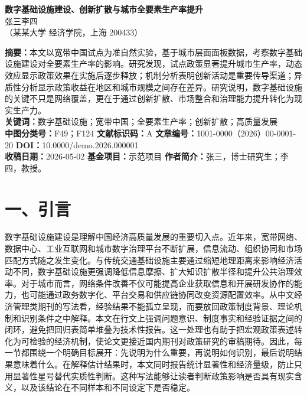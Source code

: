 \documentclass[12pt,a4paper]{article}
\begin{document}
\begin{center}
{\bfseries 数字基础设施建设、创新扩散与城市全要素生产率提升}\\[0.8em]
{ 张三\quad 李四}\\[0.4em]
{\small （某某大学 经济学院，上海 200433）}
\end{center}
\noindent\textbf{摘\quad 要：}本文以宽带中国试点为准自然实验，基于城市层面面板数据，考察数字基础设施建设对全要素生产率的影响。研究发现，试点政策显著提升城市生产率，动态效应显示政策效果在实施后逐步释放；机制分析表明创新活动是重要传导渠道；异质性分析显示政策收益在地区和城市规模之间存在差异。研究说明，数字基础设施的关键不只是网络覆盖，更在于通过创新扩散、市场整合和治理能力提升转化为现实生产力。\\
\textbf{关键词：}数字基础设施；宽带中国；全要素生产率；创新扩散；高质量发展\\
\textbf{中图分类号：}F49；F124\quad
\textbf{文献标识码：}A\quad
\textbf{文章编号：}1001-0000（2026）00-0001-20\quad
\textbf{DOI：}10.0000/demo.2026.000001\\
\textbf{收稿日期：}2026-05-02\quad
\textbf{基金项目：}示范项目\quad
\textbf{作者简介：}张三，博士研究生；李四，教授。

\section*{一、引言}
数字基础设施建设是理解中国经济高质量发展的重要切入点。近年来，宽带网络、数据中心、工业互联网和城市数字治理平台不断扩展，信息流动、组织协同和市场匹配方式随之发生变化。与传统交通基础设施主要通过缩短地理距离来影响经济活动不同，数字基础设施更强调降低信息摩擦、扩大知识扩散半径和提升公共治理效率。对于城市而言，网络条件改善不仅可能提高企业获取信息和开展研发协作的能力，也可能通过政务数字化、平台交易和供应链协同改变资源配置效率。从中文经济管理类期刊的写法看，经验结果不能孤立呈现，而要放回政策制度背景、理论机制和识别条件之中解释。本文在行文上强调问题意识、制度事实和经验证据之间的闭环，避免把回归表简单堆叠为技术性报告。这一处理也有助于把宏观政策表述转化为可检验的经济机制，使论文更接近国内期刊对政策研究的审稿期待。因此，每一节都围绕一个明确目标展开：先说明为什么重要，再说明如何识别，最后说明结果意味着什么。在解释估计结果时，本文同时报告统计显著性和经济量级，防止只用显著性星号替代实质性判断。这种写法能够让读者判断政策影响是否具有现实含义，以及该结论在不同样本和不同设定下是否稳定。
\end{document}
